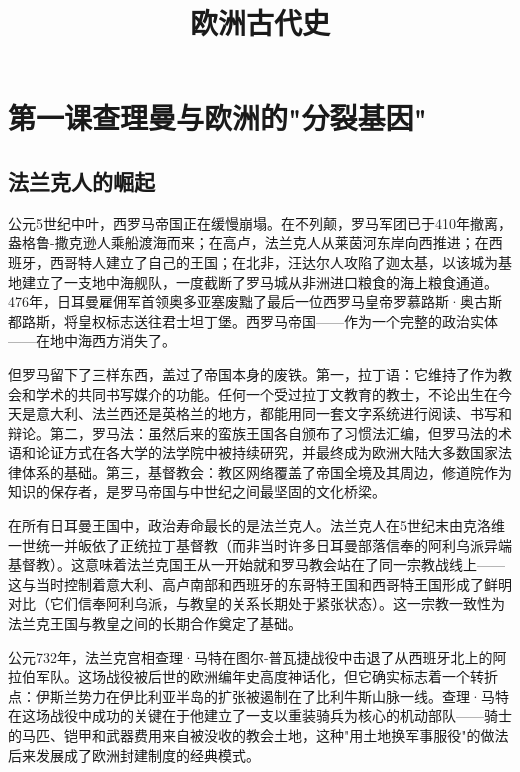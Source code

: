 \documentclass[a4paper,12pt]{ctexart}
\title{\textcolor{blue!70!black}{\Huge\textbf{欧洲古代史}}}
\author{}
\date{}
\begin{document}
\maketitle
\thispagestyle{empty}

\tableofcontents
\newpage

\section{第一课\quad 查理曼与欧洲的"分裂基因"}

\subsection{法兰克人的崛起}

公元5世纪中叶，西罗马帝国正在缓慢崩塌。在不列颠，罗马军团已于410年撤离，盎格鲁-撒克逊人乘船渡海而来；在高卢，法兰克人从莱茵河东岸向西推进；在西班牙，西哥特人建立了自己的王国；在北非，汪达尔人攻陷了迦太基，以该城为基地建立了一支地中海舰队，一度截断了罗马城从非洲进口粮食的海上粮食通道。476年，日耳曼雇佣军首领奥多亚塞废黜了最后一位西罗马皇帝罗慕路斯·奥古斯都路斯，将皇权标志送往君士坦丁堡。西罗马帝国——作为一个完整的政治实体——在地中海西方消失了。

但罗马留下了三样东西，盖过了帝国本身的废铁。第一，拉丁语：它维持了作为教会和学术的共同书写媒介的功能。任何一个受过拉丁文教育的教士，不论出生在今天是意大利、法兰西还是英格兰的地方，都能用同一套文字系统进行阅读、书写和辩论。第二，罗马法：虽然后来的蛮族王国各自颁布了习惯法汇编，但罗马法的术语和论证方式在各大学的法学院中被持续研究，并最终成为欧洲大陆大多数国家法律体系的基础。第三，基督教会：教区网络覆盖了帝国全境及其周边，修道院作为知识的保存者，是罗马帝国与中世纪之间最坚固的文化桥梁。

在所有日耳曼王国中，政治寿命最长的是法兰克人。法兰克人在5世纪末由克洛维一世统一并皈依了正统拉丁基督教（而非当时许多日耳曼部落信奉的阿利乌派异端基督教）。这意味着法兰克国王从一开始就和罗马教会站在了同一宗教战线上——这与当时控制着意大利、高卢南部和西班牙的东哥特王国和西哥特王国形成了鲜明对比（它们信奉阿利乌派，与教皇的关系长期处于紧张状态）。这一宗教一致性为法兰克王国与教皇之间的长期合作奠定了基础。

公元732年，法兰克宫相查理·马特在图尔-普瓦捷战役中击退了从西班牙北上的阿拉伯军队。这场战役被后世的欧洲编年史高度神话化，但它确实标志着一个转折点：伊斯兰势力在伊比利亚半岛的扩张被遏制在了比利牛斯山脉一线。查理·马特在这场战役中成功的关键在于他建立了一支以重装骑兵为核心的机动部队——骑士的马匹、铠甲和武器费用来自被没收的教会土地，这种"用土地换军事服役"的做法后来发展成了欧洲封建制度的经典模式。
\end{document}
